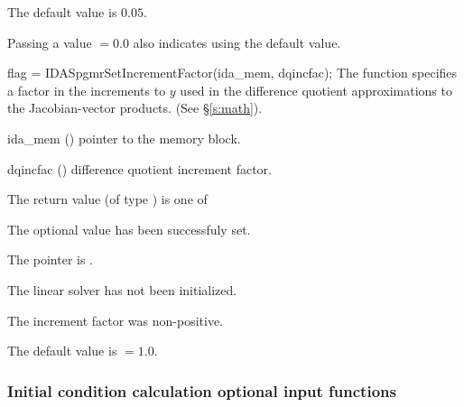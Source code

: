 {
  The default value is $0.05$.

  Passing a value $ = 0.0$ also indicates using the default value.
}
{
  flag = IDASpgmrSetIncrementFactor(ida\_mem, dqincfac);
}
{
  The function  specifies a factor in the 
  increments to $y$ used in the difference quotient approximations 
  to the Jacobian-vector products.  (See \S\ref{s:math}).
}
{
  \begin{args}[dqincfac]
  \item[ida\_mem] ()
    pointer to the {\ida} memory block.
  \item[dqincfac] ()
    difference quotient increment factor.
  \end{args}
}
{
  The return value  (of type ) is one of
  \begin{args}
  \item[\Id{IDASPGMR\_SUCCESS}] 
    The optional value has been successfuly set.
  \item[\Id{IDASPGMR\_MEM\_NULL}]
    The  pointer is .
  \item[\Id{IDASPGMR\_LMEM\_NULL}]
    The {\idaspgmr} linear solver has not been initialized.
  \item[\Id{IDASPGMR\_ILL\_INPUT}]
    The increment factor was non-positive.
  \end{args}
}
{
  The default value is  $=1.0$.
}

\subsubsection{Initial condition calculation optional input functions}

